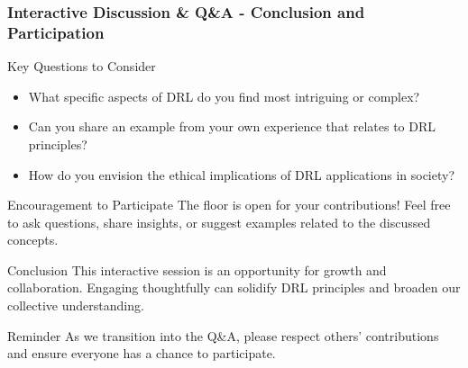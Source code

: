 \documentclass[aspectratio=169]{beamer}
\begin{document}
\begin{frame}[fragile]
  \frametitle{Interactive Discussion \& Q\&A - Conclusion and Participation}
  \begin{block}{Key Questions to Consider}
    \begin{itemize}
      \item What specific aspects of DRL do you find most intriguing or complex?
      \item Can you share an example from your own experience that relates to DRL principles?
      \item How do you envision the ethical implications of DRL applications in society?
    \end{itemize}
  \end{block}

  \begin{block}{Encouragement to Participate}
    The floor is open for your contributions! 
    Feel free to ask questions, share insights, or suggest examples related to the discussed concepts.
  \end{block}

  \begin{block}{Conclusion}
    This interactive session is an opportunity for growth and collaboration.
    Engaging thoughtfully can solidify DRL principles and broaden our collective understanding. 
  \end{block}

  \begin{block}{Reminder}
    As we transition into the Q\&A, please respect others' contributions and ensure everyone has a chance to participate.
  \end{block}
\end{frame}
\end{document}
